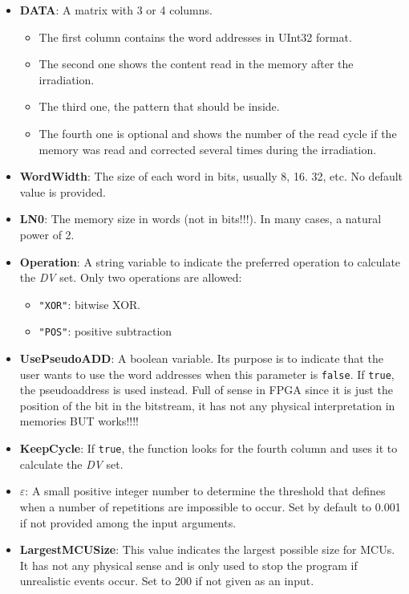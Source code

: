 \begin{itemize}
\begin{itemize}
	 	\item   \textbf{DATA}: A matrix with 3 or 4 columns. 
	 	\begin{itemize}
	 		\item The first column contains the word addresses in UInt32 format.
	 		\item The second one shows the content read in the memory after the irradiation.
	 		\item The third one, the pattern that should be inside.
	 		\item  The fourth one is optional and shows the number of the read cycle if the   memory was read and corrected several times during the irradiation.
	 	\end{itemize}
	 	\item   \textbf{WordWidth}: The size of each word in bits, usually 8, 16. 32, etc. No default value is provided.
	 	\item   \textbf{LN0}: The memory size in words (not in bits!!!). In many cases, a natural power of 2.
	 	\item   \textbf{Operation}: A string variable to indicate the preferred operation to calculate
	 	the \textit{DV} set. Only two operations are allowed: 
	 	\begin{itemize}
	 		\item \texttt{"XOR"}: bitwise XOR.
	 		\item\texttt{"POS"}: positive subtraction
	 	\end{itemize}
	 	\item  \textbf{UsePseudoADD}: A boolean variable. Its purpose is to indicate that the user wants to use the word addresses when this parameter is \texttt{false}. If \texttt{true}, the pseudoaddress  is used instead. Full of sense in FPGA since it is just the position  of the bit in the bitstream, it has not any physical interpretation in memories BUT works!!!!
	 	\item   \textbf{KeepCycle}: If \texttt{true}, the function looks for the fourth column and uses it to calculate the \textit{DV} set.
	 	\item   \textbf{\(\varepsilon\)}: A small positive integer number to determine the threshold that defines when a number of repetitions are impossible to occur. Set by default to 0.001 if not provided among the input arguments.
	 	\item  \textbf{LargestMCUSize}: This value indicates the largest possible size for MCUs. It has not any physical sense  and is only used to stop the program if unrealistic events occur. Set to 200 if not given as an input.
	 	

\end{itemize}
\end{itemize}
